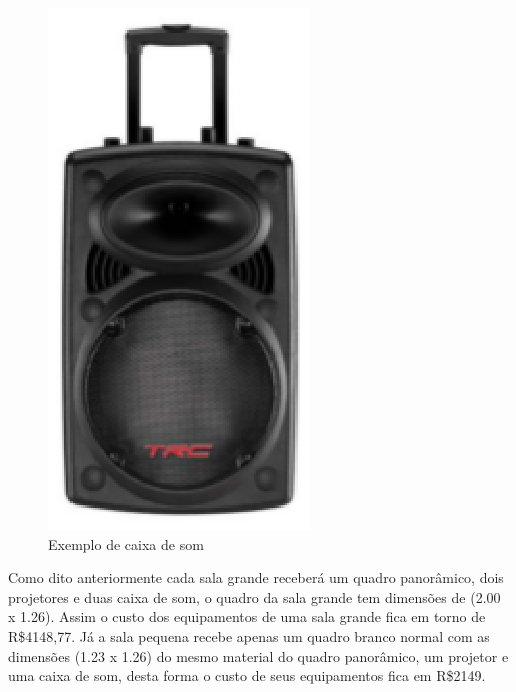 \begin{figure}[!h]
\centering
\includegraphics[scale=1]{figuras/caixa_de_som.eps}
\caption{Exemplo de caixa de som}
\end{figure}

Como dito anteriormente cada sala grande receberá um quadro panorâmico, dois projetores e duas caixa de som, o quadro da sala grande tem dimensões de (2.00 x 1.26). Assim o custo dos equipamentos de uma sala grande fica em torno de R\$4148,77. Já a sala pequena recebe apenas um quadro branco normal com as dimensões (1.23 x 1.26) do mesmo material do quadro panorâmico, um projetor e uma caixa de som, desta forma o custo de seus equipamentos fica em R\$2149.

